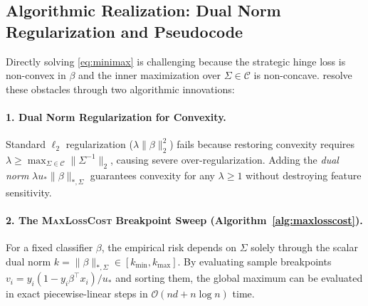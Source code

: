 \documentclass[10pt, letterpaper]{article}
\newcommand{\C}{\mathcal{C}}
\begin{document}
\subsection{Algorithmic Realization: Dual Norm Regularization and Pseudocode}
Directly solving \eqref{eq:minimax} is challenging because the strategic hinge loss is non-convex in $\beta$ and the inner maximization over $\Sigma \in \C$ is non-concave. \citet{rosenfeld2024oneshot} resolve these obstacles through two algorithmic innovations:

\paragraph{1. Dual Norm Regularization for Convexity.} Standard $\ell_2$ regularization ($\lambda \|\beta\|_2^2$) fails because restoring convexity requires $\lambda \ge \max_{\Sigma \in \C} \|\Sigma^{-1}\|_2$, causing severe over-regularization. Adding the \emph{dual norm} $\lambda u_* \|\beta\|_{*,\Sigma}$ guarantees convexity for any $\lambda \ge 1$ without destroying feature sensitivity.

\paragraph{2. The \textsc{MaxLossCost} Breakpoint Sweep (Algorithm~\ref{alg:maxlosscost}).} For a fixed classifier $\beta$, the empirical risk depends on $\Sigma$ solely through the scalar dual norm $k = \|\beta\|_{*,\Sigma} \in [k_{\min}, k_{\max}]$. By evaluating sample breakpoints $v_i = y_i(1 - y_i \beta^\top x_i) / u_*$ and sorting them, the global maximum can be evaluated in exact piecewise-linear steps in $\mathcal{O}(nd + n\log n)$ time.
\end{document}
